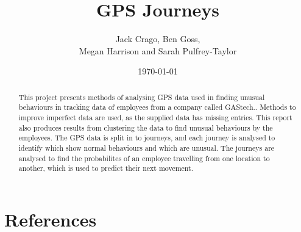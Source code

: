 \documentclass[a4paper]{article}
\title{\huge GPS Journeys}
\newcommand{\HRule}{\rule{\linewidth}{0.5mm}}
\begin{document}






\author{Jack Crago, Ben Goss, \\ Megan Harrison and Sarah Pulfrey-Taylor}

\date{\today}


\maketitle


\begin{abstract}

This project presents methods of analysing GPS data used in finding unusual behaviours in tracking data of employees from a company called GAStech.. 
Methods to improve imperfect data are used, as the supplied data has missing entries. This report also produces results from clustering the data to find unusual behaviours by the employees. The GPS data is  split in to journeys, and each journey is analysed to identify which show normal behaviours and which are unusual. The journeys are  analysed to find the probabilites of an employee travelling from one location to another, which is used to predict their next movement.  



\end{abstract}

\clearpage

\tableofcontents
{}
\clearpage




















\section{References}


\end{document}
